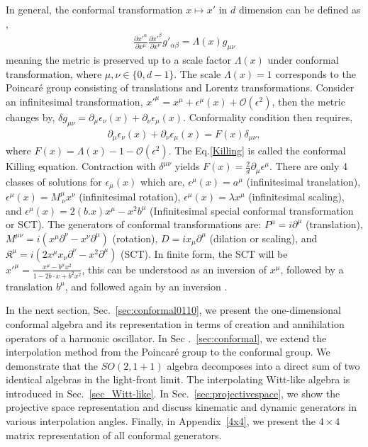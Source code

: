 \documentclass[%
 reprint,
superscriptaddress,
 amsmath,amssymb,
 aps,
]{revtex4-2}
\begin{document}
In general, the conformal transformation $x\longmapsto x'$ in $d$ dimension can be defined as \cite{Francesco,Blumenhagen}, 
\begin{align}
    \frac{\partial x'^{\alpha}}{\partial x^{\mu}}\frac{\partial x'^{\beta}}{\partial x^{\nu}}g'_{\alpha\beta}=\Lambda(x)g_{\mu\nu}
\end{align}
meaning the metric is preserved up to a scale factor $\Lambda(x)$ under conformal transformation, where $\mu,\nu\in\{0,d-1\}$. The scale $\Lambda(x)=1$ corresponds to the Poincar\'e group consisting of translations and Lorentz transformations. Consider an infinitesimal transformation, $x'^{\mu}=x^{\mu}+\epsilon^{\mu}(x)+\mathcal{O}(\epsilon^2)$, then the metric changes by, $\delta g_{\mu\nu}=\partial_{\mu}\epsilon_{\nu}(x)+\partial_{\nu}\epsilon_{\mu}(x)$. Conformality condition then requires, 
\begin{align}
    \partial_{\mu}\epsilon_{\nu}(x)+\partial_{\nu}\epsilon_{\mu}(x)=F(x)\delta_{\mu\nu},\label{Killing}
\end{align}
where $F(x)=\Lambda(x)-1-\mathcal{O}(\epsilon^2)$. The Eq.\eqref{Killing} is called the conformal Killing equation. Contraction with $\delta^{\mu\nu}$ yields $F(x)=\frac{2}{d}\partial_{\mu}\epsilon^{\mu}$. There are only 4 classes of solutions for $\epsilon_{\mu}(x)$ which are, $\epsilon^{\mu}(x)=a^{\mu}$ (infinitesimal translation), $\epsilon^{\mu}(x)=M^{\mu}_{~\nu}x^{\nu}$ (infinitesimal rotation), $\epsilon^{\mu}(x)=\lambda x^{\mu}$ (infinitesimal scaling), and $\epsilon^{\mu}(x)=2(b.x) x^{\mu}-x^2b^{\mu}$ (Infinitesimal special conformal transformation or SCT). The generators of conformal transformations are: $P^{{\mu}}=i\partial^{{\mu}}$ (translation), $M^{{\mu}{\nu}}=i\left(x^{{\mu}}\partial^{{\nu}}-x^{{\nu}}\partial^{{\mu}}\right)$ (rotation), $D=ix_{{\mu}}\partial^{{\mu}}$ (dilation or scaling), and $\mathfrak{K}^{{\mu}}=i\left(2x^{{\mu}}x_{{\nu}}\partial^{{\nu}}-x^2\partial^{{\mu}}\right)$ (SCT). In finite form, the SCT will be $x'^{\mu }={\frac {x^{\mu }-b^{\mu }x^{2}}{1-2b\cdot x+b^{2}x^{2}}}$, this can be understood as an inversion of $x^\mu$, followed by a translation $b^\mu$, and followed again by an inversion \cite{Blumenhagen}.

In the next section, Sec.~\ref{sec:conformal0110}, we present the one-dimensional conformal algebra and its representation in terms of creation and annihilation operators of a harmonic oscillator. In Sec .~\ref{sec:conformal}, we extend the interpolation method from the Poincar\'e group to the conformal group. We demonstrate that the $SO(2, 1 + 1)$ algebra decomposes into a direct sum of two identical algebras in the light-front limit. The interpolating Witt-like algebra is introduced in Sec.~\ref{sec_Witt-like}. In Sec.~\ref{sec:projectivespace}, we show the projective space representation and discuss kinematic and dynamic generators in various interpolation angles. Finally, in Appendix~\ref{4x4}, we present the $4\times4$ matrix representation of all conformal generators. 
\end{document}
